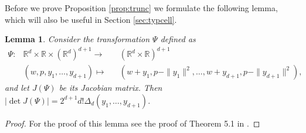 \documentclass[11pt,a4paper]{article}
\theoremstyle{plain}
\newtheorem{lemma}[theorem]{Lemma}
\theoremstyle{definition}
\theoremstyle{remark}
\def\RR{\mathbb{R}}
\begin{document}
Before we prove Proposition \ref{prop:trunc} we formulate the following lemma, which will also be useful in Section \ref{sec:typcell}.

\begin{lemma}\label{lm:jacobian}
    Consider the transformation $\Psi$ defined as
    \begin{align*}
        \Psi\colon  &\RR^{d} \times \RR \times (\RR^{d})^{d+1} \to &&(\RR^{d} \times \RR)^{d+1}\\
        &(w,p,y_1,\dots,y_{d+1}) \mapsto &&(w+y_1,p-\|y_1\|^2,\dots,w+y_{d+1},p-\|y_{d+1}\|^2),
    \end{align*}
    and let $J(\Psi)$ be its Jacobian matrix.  Then $|\det J(\Psi)| =2^{d+1}d!\Delta_{d}(y_1,\dots,y_{d+1})$.
\end{lemma}

\begin{proof}
    For the proof of this lemma see the proof of Theorem 5.1 in \cite{GKT21}.
\end{proof}
\end{document}
